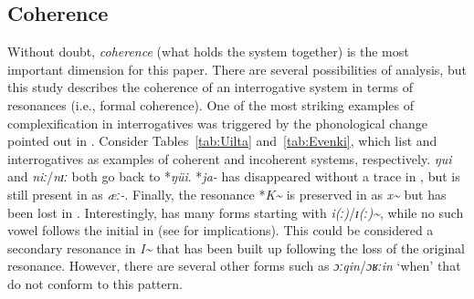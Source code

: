 \documentclass[output=paper,hidelinks]{langscibook}
\begin{document}
\subsection{Coherence}
Without doubt, \textit{coherence} (what holds the system together) is the most important dimension for this paper. There are several possibilities of analysis, but this study describes the coherence of an interrogative system in terms of resonances (i.e., formal coherence). One of the most striking examples of complexification in  interrogatives was triggered by the phonological change pointed out in . Consider Tables~\ref{tab:Uilta} and~\ref{tab:Evenki}, which list  and  interrogatives as examples of coherent and incoherent systems, respectively.  \textit{ŋui} and  \textit{niː}/\textit{nɪː} both go back to *\textit{ŋüi}.  *\textit{ja-} has disappeared without a trace in , but is still present in  as \textit{æː-}. Finally, the resonance *\textit{K\textasciitilde} is preserved in  as \textit{x\textasciitilde} but has been lost in . Interestingly,  has many forms starting with \textit{i(ː)}/\textit{ɪ(ː)\textasciitilde}, while no such vowel follows the initial in  (see  for implications). This could be considered a secondary resonance in \textit{I\textasciitilde} that has been built up following the loss of the original resonance. However, there are several other forms such as \textit{ɔːqin}/\textit{ɔʁːin} `when' that do not conform to this pattern.
\end{document}
